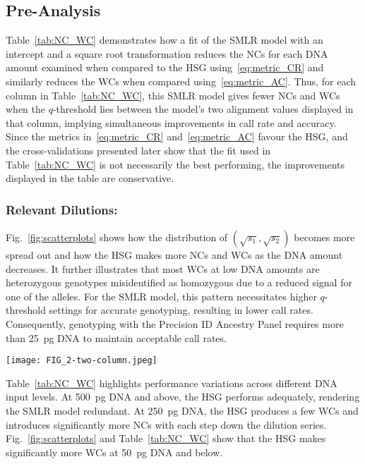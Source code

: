 \documentclass[preprint,5p,times,11pt]{elsarticle}
\begin{document}
\subsection{Pre-Analysis}
Table~\ref{tab:NC_WC} demonstrates how a fit of the SMLR model with an intercept and a square root transformation reduces the NCs for each DNA amount examined when compared to the HSG using~\eqref{eq:metric_CR} and similarly reduces the WCs when compared using~\eqref{eq:metric_AC}.
Thus, for each column in Table~\ref{tab:NC_WC}, this SMLR model gives fewer NCs and WCs when the $q$-threshold lies between the model’s two alignment values displayed in that column, implying simultaneous improvements in call rate and accuracy.
Since the metrics in~\eqref{eq:metric_CR} and~\eqref{eq:metric_AC} favour the HSG, and the cross-validations presented later show that the fit used in Table~\ref{tab:NC_WC} is not necessarily the best performing, the improvements displayed in the table are conservative.



\subsubsection*{Relevant Dilutions:}
Fig.~\ref{fig:scatterplots} shows how the distribution of $(\sqrt{s_1}, \sqrt{s_2})$ becomes more spread out and how the HSG makes more NCs and WCs as the DNA amount decreases.
It further illustrates that most WCs at low DNA amounts are heterozygous genotypes misidentified as homozygous due to a reduced signal for one of the alleles.
For the SMLR model, this pattern necessitates higher $q$-threshold settings for accurate genotyping, resulting in lower call rates.
Consequently, genotyping with the Precision ID Ancestry Panel requires more than \SI{25}{\pg} DNA to maintain acceptable call rates.
\begin{figure*}
\centering
\texttt{[image: FIG\_2-two-column.jpeg]}
\caption{
Distribution of square-root transformed allele signals.\\
A dot represents a set of read counts $(s_1, s_2)$ for an SNP and is coloured according to the true genotype: red for heterozygous and blue or yellow for homozygous genotypes.
The displayed DNA quantities indicate where the accuracy of the HID SNP Genotyper Plugin falls below 100\%, with its wrong calls marked by red crosses and no-calls by black pluses.
}
\label{fig:scatterplots}
\end{figure*}

Table~\ref{tab:NC_WC} highlights performance variations across different DNA input levels.
At \SI{500}{\pg} DNA and above, the HSG performs adequately, rendering the SMLR model redundant.
At \SI{250}{\pg} DNA, the HSG produces a few WCs and introduces significantly more NCs with each step down the dilution series.
Fig.~\ref{fig:scatterplots} and Table~\ref{tab:NC_WC} show that the HSG makes significantly more WCs at \SI{50}{\pg} DNA and below.
\end{document}
